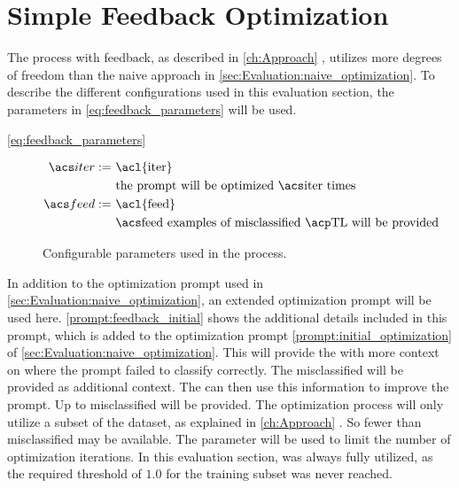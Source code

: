 \newpage


\section{Simple Feedback Optimization}
\label{sec:Evaluation:simple_feedback_optimization}

The \APE process with feedback, as described in \autoref{ch:Approach} , utilizes more degrees of freedom than the naive approach in \autoref{sec:Evaluation:naive_optimization}.
To describe the different configurations used in this evaluation section, the parameters in \autoref{eq:feedback_parameters} will be used.

\autoref{eq:feedback_parameters}

\begin{figure}
    \raggedright
    \caption{Configurable parameters used in the \APE process.}
    \begin{equation}
        \label{eq:feedback_parameters}
        \begin{aligned}
            \iter := & \ \text{\acl{iter}} \\
            & \ \text{the prompt will be optimized \iter times} \\
            \feed :=    & \ \text{\acl{feed}} \\
            & \ \text{\feed examples of misclassified \TLs will be provided}
        \end{aligned}
    \end{equation}
\end{figure}

In addition to the optimization prompt used in \autoref{sec:Evaluation:naive_optimization}, an extended optimization prompt will be used here.
\autoref{prompt:feedback_initial} shows the additional details included in this prompt, which is added to the optimization prompt \autoref{prompt:initial_optimization} of \autoref{sec:Evaluation:naive_optimization}.
This will provide the \LLM with more context on where the prompt failed to classify correctly.
The misclassified \TLs will be provided as additional context.
The \LLM can then use this information to improve the prompt.
Up to \feed misclassified \TLs will be provided.
The optimization process will only utilize a subset of the dataset, as explained in \autoref{ch:Approach} .
So fewer than \feed misclassified \TLs may be available.
The parameter \iter will be used to limit the number of optimization iterations.
In this evaluation section, \iter was always fully utilized, as the required \fone threshold of $1.0$ for the training subset  was never reached.

